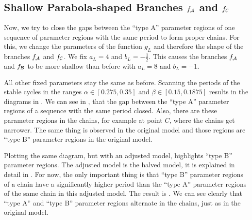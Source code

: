 \subsection{Shallow Parabola-shaped Branches $f_{\mathcal{A}}$ and $f_{\mathcal{C}}$}
\label{sec:setup.quad.hyper.2}

Now, we try to close the gaps between the ``type A'' parameter regions of one sequence of parameter regions with the same period to form proper chains.
For this, we change the parameters of the function $g_L$ and therefore the shape of the branches $f_{\mathcal{A}}$ and $f_{\mathcal{C}}$.
We fix $a_L = 4$ and $b_L = -\frac{1}{2}$.
This causes the branches $f_{\mathcal{A}}$ and $f_{\mathcal{B}}$ to be more shallow than before with $a_L = 8$ and $b_L = -1$.

All other fixed parameters stay the same as before.
Scanning the periods of the stable cycles in the ranges $\alpha \in [0.275, 0.35]$ and $\beta \in [0.15, 0.1875]$ results in the diagrams in .
We can see in , that the gap between the ``type A'' parameter regions of a sequence with the same period closed.
Also, there are these parameter regions in the chains, for example at point $C$, where the chains get narrower.
The same thing is observed in the original model and those regions are ``type B'' parameter regions in the original model.

Plotting the same diagram, but with an adjusted model, highlights ``type B'' parameter regions.
The adjusted model is the halved model, it is explained in detail in .
For now, the only important thing is that ``type B'' parameter regions of a chain have a significantly higher period than the ``type A'' parameter regions of the same chain in this adjusted model.
The result is .
We can see clearly that ``type A'' and ``type B'' parameter regions alternate in the chains, just as in the original model.


